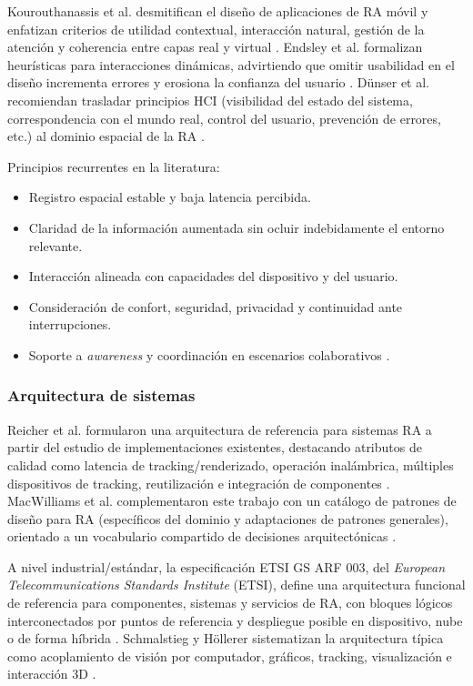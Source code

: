 \documentclass[conference]{IEEEtran}
\begin{document}
Kourouthanassis et al. desmitifican el diseño de aplicaciones de RA móvil y enfatizan criterios de utilidad contextual, interacción natural, gestión de la atención y coherencia entre capas real y virtual \cite{Kourouthanassis2015}. Endsley et al. formalizan heurísticas para interacciones dinámicas, advirtiendo que omitir usabilidad en el diseño incrementa errores y erosiona la confianza del usuario \cite{Endsley2017}. Dünser et al. recomiendan trasladar principios HCI (visibilidad del estado del sistema, correspondencia con el mundo real, control del usuario, prevención de errores, etc.) al dominio espacial de la RA \cite{Dunser2007}.

Principios recurrentes en la literatura:

\begin{itemize}
\item Registro espacial estable y baja latencia percibida.
\item Claridad de la información aumentada sin ocluir indebidamente el entorno relevante.
\item Interacción alineada con capacidades del dispositivo y del usuario.
\item Consideración de confort, seguridad, privacidad y continuidad ante interrupciones.
\item Soporte a \textit{awareness} y coordinación en escenarios colaborativos \cite{Sereno2022}.
\end{itemize}

\subsubsection{Arquitectura de sistemas}

Reicher et al. formularon una arquitectura de referencia para sistemas RA a partir del estudio de implementaciones existentes, destacando atributos de calidad como latencia de tracking/renderizado, operación inalámbrica, múltiples dispositivos de tracking, reutilización e integración de componentes \cite{Reicher2003}. MacWilliams et al. complementaron este trabajo con un catálogo de patrones de diseño para RA (específicos del dominio y adaptaciones de patrones generales), orientado a un vocabulario compartido de decisiones arquitectónicas \cite{MacWilliams2004}.

A nivel industrial/estándar, la especificación ETSI GS ARF 003, del \textit{European Telecommunications Standards Institute} (ETSI), define una arquitectura funcional de referencia para componentes, sistemas y servicios de RA, con bloques lógicos interconectados por puntos de referencia y despliegue posible en dispositivo, nube o de forma híbrida \cite{ETSI-ARF003}. Schmalstieg y Höllerer sistematizan la arquitectura típica como acoplamiento de visión por computador, gráficos, tracking, visualización e interacción 3D \cite{Schmalstieg2016}.
\end{document}
